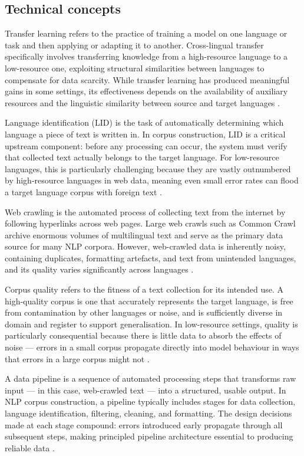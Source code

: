 \documentclass[12pt]{ThesisRU}
\begin{document}
\subsection{Technical concepts}
Transfer learning refers to the practice of training a model on one language or task and then applying or adapting it to another. Cross-lingual transfer specifically involves transferring knowledge from a high-resource language to a low-resource one, exploiting structural similarities between languages to compensate for data scarcity. While transfer learning has produced meaningful gains in some settings, its effectiveness depends on the availability of auxiliary resources and the linguistic similarity between source and target languages \citep{hedderich2021survey}.

Language identification (LID) is the task of automatically determining which language a piece of text is written in. In corpus construction, LID is a critical upstream component: before any processing can occur, the system must verify that collected text actually belongs to the target language. For low-resource languages, this is particularly challenging because they are vastly outnumbered by high-resource languages in web data, meaning even small error rates can flood a target language corpus with foreign text \citep{article}.

Web crawling is the automated process of collecting text from the internet by following hyperlinks across web pages. Large web crawls such as Common Crawl archive enormous volumes of multilingual text and serve as the primary data source for many NLP corpora. However, web-crawled data is inherently noisy, containing duplicates, formatting artefacts, and text from unintended languages, and its quality varies significantly across languages \citep{dodge2021documenting}.

Corpus quality refers to the fitness of a text collection for its intended use. A high-quality corpus is one that accurately represents the target language, is free from contamination by other languages or noise, and is sufficiently diverse in domain and register to support generalisation. In low-resource settings, quality is particularly consequential because there is little data to absorb the effects of noise — errors in a small corpus propagate directly into model behaviour in ways that errors in a large corpus might not \citep{hurtado2022documents}.

A data pipeline is a sequence of automated processing steps that transforms raw input — in this case, web-crawled text — into a structured, usable output. In NLP corpus construction, a pipeline typically includes stages for data collection, language identification, filtering, cleaning, and formatting. The design decisions made at each stage compound: errors introduced early propagate through all subsequent steps, making principled pipeline architecture essential to producing reliable data \citep{suchomel2020better}.
\end{document}

